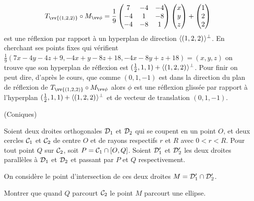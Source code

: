 \documentclass[a4paper,12pt,reqno]{amsart}
\begin{document}
\begin{solution}
\begin{enumerate}
      \[
        T_{\vv{(1,2,2)}}\circ M_{\vv\phi} =\frac{1}{9}
          \begin{pmatrix}
             7 & -4 & -4 \\
            -4 &  1 & -8 \\
            -4 & -8 &  1
          \end{pmatrix}
        \begin{pmatrix} x\\ y\\ z\end{pmatrix}
        +
        \begin{pmatrix} 1\\ 2\\ 2\end{pmatrix}
      \]
      est une réflexion par rapport à un hyperplan de direction $\langle{(1,2,2)}\kern.07em\rangle^{\perp}$. En cherchant ses points fixes qui vérifient $\frac{1}{9}(7x-4y-4z+9,-4x+y-8z+18,-4x-8y+z+18) = (x,y,z)$ on trouve que son hyperplan de réflexion est $(\frac12,1,1)+\langle{(1,2,2)}\kern.07em\rangle^{\perp}$. Pour finir on peut dire, d'après le cours, que comme $(0,1,-1)$ est dans la direction du plan de réflexion de $T_{\vv{(1,2,2)}}\circ M_{\vv\phi}$ alors $\phi$ est une réflexion glissée par rapport à l'hyperplan $(\frac12,1,1)+\langle{(1,2,2)}\kern.07em\rangle^{\perp}$ et de vecteur de translation $(0,1,-1)$.
  \end{enumerate}
\end{solution}



\sisujet{\bigskip}
\begin{exo} (Coniques)

  Soient deux droites orthogonales $\mathcal{D}_{1}$ et $\mathcal{D}_{2}$ qui se coupent en un point $O$, et deux cercles $\mathcal{C}_{1}$ et $\mathcal{C}_{2}$ de centre $O$ et de rayons respectifs $r$ et $R$ avec $0<r<R$.\newline
  Pour tout point $Q$ sur $\mathcal{C}_{2}$, soit $P=\mathcal{C}_{1}\cap [O,Q]$.
  Soient $\mathcal{D}'_{1}$ et $\mathcal{D}'_{2}$ les deux droites parallèles à $\mathcal{D}_{1}$ et $\mathcal{D}_{2}$ et passant par $P$ et $Q$ respectivement.

  On considère le point d'intersection de ces deux droites $M=\mathcal{D}'_{1}\cap \mathcal{D}'_{2}$.

  Montrer que quand $Q$ parcourt $\mathcal{C}_{2}$ le point $M$ parcourt une ellipse.

\end{exo}
\end{document}
